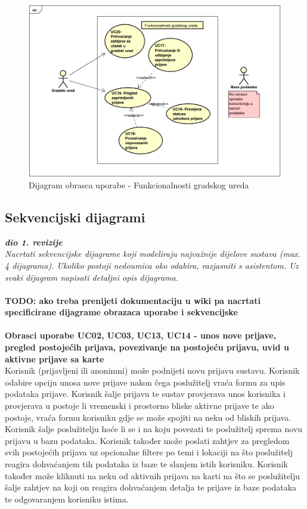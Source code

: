 				
				\begin{figure}[H]
			\includegraphics[scale=0.8]{slike/obrazac_gradski.PNG} %
			\centering
			\caption{Dijagram obrasca uporabe - Funkcionalnosti gradskog ureda}
		\end{figure}
			\subsection{Sekvencijski dijagrami}
				
				\textbf{\textit{dio 1. revizije}}\\
				
				
				\textit{Nacrtati sekvencijske dijagrame koji modeliraju najvažnije dijelove sustava (max. 4 dijagrama). Ukoliko postoji nedoumica oko odabira, razjasniti s asistentom. Uz svaki dijagram napisati detaljni opis dijagrama.}
				\\
				\\
				\textbf{TODO: ako treba prenijeti dokumentaciju u wiki pa nacrtati specificirane dijagrame obrazaca uporabe i sekvencijske}
				\\
				\\
				\textbf{Obrasci uporabe UC02, UC03, UC13, UC14 - unos nove prijave, pregled postojećih prijava, povezivanje na postojeću prijavu, uvid u aktivne prijave sa karte}\\
				Korisnik (prijavljeni ili anonimni) može podnijeti novu prijavu sustavu. Korisnik odabire opciju unosa nove prijave nakon čega poslužitelj vraća formu za upis podataka prijave. 
				Korisnik šalje prijavu te sustav provjerava unos korisnika i provjerava u postoje li vremenski i prostorno bliske aktivne prijave te ako postoje, vraća formu korisniku gdje se može spojiti na neku od bliskih prijava. 
				Korisnik šalje poslužitelju hoće li se i na koju povezati te poslužitelj sprema novu prijavu u bazu podataka. Korisnik također može poslati zahtjev za pregledom svih postojećih prijava uz opcionalne filtere po temi i lokaciji na što poslužitelj reagira dohvaćanjem tih podataka iz baze te slanjem istih korisniku. 
				Korisnik također može kliknuti na neku od aktivnih prijava na karti na što se poslužitelju šalje zahtjev na koji on reagira dohvaćanjem detalja te prijave iz baze podataka te odgovaranjem korisniku istima.
				
